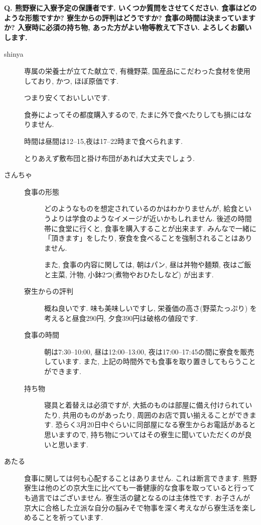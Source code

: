 \documentclass[10pt,b5jsbook,dvips,dvipdfmx,openany]{jsbook}
\theoremstyle{definition}
\begin{document}
\begin{multicols}{2}
		\begin{tcolorbox}
		\textbf{Q. 熊野寮に入寮予定の保護者です. いくつか質問をさせてください. 
		食事はどのような形態ですか? 寮生からの評判はどうですか? 食事の時間は決まっていますか? 入寮時に必須の持ち物, あった方がよい物等教えて下さい. よろしくお願いします. }
		\end{tcolorbox}
		\begin{description}
		\item[shinya]
		専属の栄養士が立てた献立で, 有機野菜, 国産品にこだわった食材を使用しており, かつ, ほぼ原価です. 

		つまり安くておいしいです. 

		食券によってその都度購入するので, たまに外で食べたりしても損にはなりません. 

		時間は昼間は12--15,夜は17--22時まで食べられます. 

		とりあえず敷布団と掛け布団があれば大丈夫でしょう. 

		\item[さんちゃ]
			\begin{description}
			\item[食事の形態] 
			どのようなものを想定されているのかはわかりませんが, 給食というよりは学食のようなイメージが近いかもしれません. 後述の時間帯に食堂に行くと, 食事を購入することが出来ます. 	みんなで一緒に「頂きます」をしたり, 寮食を食べることを強制されることはありません. 

		また, 食事の内容に関しては, 朝はパン, 昼は丼物や麺類, 夜はご飯と主菜, 汁物, 小鉢2つ(煮物やおひたしなど) が出ます. 

			\item[寮生からの評判] 概ね良いです. 味も美味しいですし, 栄養価の高さ(野菜たっぷり) を考えると昼食290円, 夕食390円は破格の値段です. 

			\item[食事の時間] 朝は7:30--10:00, 昼は12:00--13:00, 夜は17:00--17:45の間に寮食を販売しています. また, 上記の時間外でも食事を取り置きしてもらうことができます. 

			\item[持ち物]寝具と着替えは必須ですが, 大抵のものは部屋に備え付けられていたり, 共用のものがあったり, 周囲のお店で買い揃えることができます. 恐らく3月20日中ぐらいに同部屋になる寮生からお電話があると思いますので, 持ち物についてはその寮生に聞いていただくのが良いと思います. 
			\end{description}

		\item[あたる]
		食事に関しては何も心配することはありません. これは断言できます. 熊野寮生は他のどの京大生に比べても一番健康的な食事を取っていると行っても過言ではございません. 寮生活の鍵となるのは主体性です. お子さんが京大に合格した立派な自分の脳みそで物事を深く考えながら寮生活を楽しめることを祈っています. 
		\end{description}



		\end{multicols}
\end{document}

